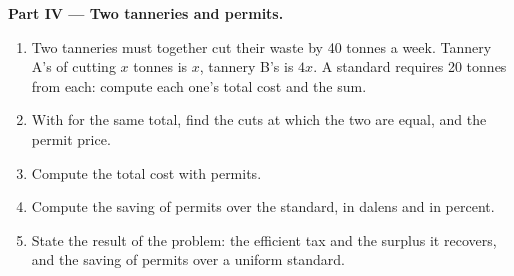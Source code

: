 \begin{problem}
\medskip
\noindent\textbf{Part IV --- Two tanneries and permits.}
\begin{enumerate}[resume]
\item Two tanneries must together cut their waste by 40 tonnes a week. Tannery A's  of cutting $x$ tonnes is $x$, tannery B's is $4x$. A standard requires 20
tonnes from each: compute each one's total cost and the sum.
\item With  for the same total, find the cuts at which the two  are equal, and the permit price.
\item Compute the total cost with permits.
\item Compute the saving of permits over the standard, in dalens and in percent.
\item State the result of the problem: the efficient tax and the surplus it recovers, and the saving of permits over a uniform standard.
\end{enumerate}
\end{problem}
